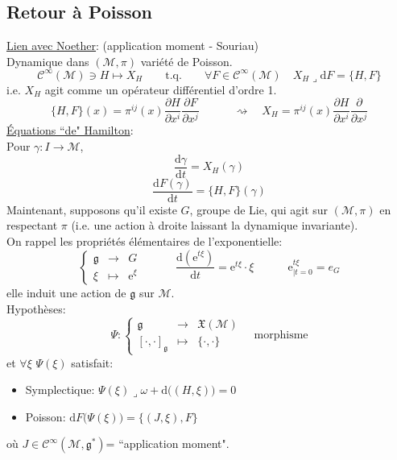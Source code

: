 \documentclass[a4paper,11pt]{article}
\renewcommand{\d}{{\mathrm{d}}}
\newcommand{\e}{{\mathrm{e}}}
\newcommand{\dr}[2]{\frac{\partial {#1}}{\partial{#2}}}
\begin{document}
\subsection{Retour à Poisson}
\noindent \underline{Lien avec Noether}: (application moment - Souriau)\\
Dynamique dans $(\mathcal{M},\pi)$ variété de Poisson.
$$\mathcal{C}^\infty(\mathcal{M}) \ni H \mapsto X_H \quad \quad \mathrm{t}.\mathrm{q}. \quad\quad \forall F \in \mathcal{C}^\infty(\mathcal{M}) \quad X_H \lrcorner \d F = \{H,F\}$$
i.e. $X_H$ agit comme un opérateur différentiel d'ordre 1.
$$\{H,F\}(x) = \pi^{ij}(x) \dr H{x^i} \dr F{x^j} \quad \quad \quad \rightsquigarrow \quad \boxed{X_H = \pi^{ij}(x) \dr H{x^i} \dr{}{x^j}}$$
\underline{Équations ``de" Hamilton}:\\
Pour $\gamma: I\to \mathcal{M}$, 
$$\frac{\d\gamma}{\d t} = X_H(\gamma)$$
$$\frac{\d F(\gamma)}{\d t} = \{H,F\}(\gamma)$$
Maintenant, supposons qu'il existe $G$, groupe de Lie, qui agit sur $(\mathcal{M},\pi)$ en respectant $\pi$ (i.e. une action à droite laissant la dynamique invariante).\\
On rappel les propriétés élémentaires de l'exponentielle:
$$\left\{\begin{matrix}
\mathfrak{g} & \to & G\\
\xi & \mapsto & \e^\xi
\end{matrix}\right.
\quad \quad \quad
\frac{\d \left(\e^{t\xi}\right)}{\d t} = \e^{t\xi}\cdot\xi
 \quad \quad \quad
\e^{t\xi}_{|t=0} = e_G$$
elle induit une action de $\mathfrak{g}$ sur $\mathcal{M}$.\\
Hypothèses:
$$\Psi: \left\{
\begin{matrix}
\mathfrak{g} & \to & \mathfrak{X}(\mathcal{M})\\
[\cdot,\cdot]_\mathfrak{g} & \mapsto & \{\cdot,\cdot\}
\end{matrix}\right.\quad \mathrm{morphisme}$$
et $\forall \xi$ $\Psi(\xi)$ satisfait:
\begin{itemize}
\item Symplectique: $\Psi(\xi) \lrcorner \omega + \d \big((H,\xi)\big) = 0$
\item Poisson: $\d F\big(\Psi(\xi)\big) = \{(J,\xi),F\}$
\end{itemize}
où $J\in\mathcal{C}^\infty(\mathcal{M},\mathfrak{g}^*)$= ``application moment".
\end{document}
